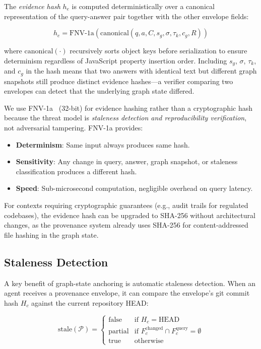 \documentclass[conference]{IEEEtran}
\begin{document}
The \emph{evidence hash} $h_e$ is computed deterministically over a
canonical representation of the query-answer pair together with the
other envelope fields:

\begin{equation}
  h_e = \text{FNV-1a}\!\left(\text{canonical}(q, a, C, s_g, \sigma, \tau_k, c_g, R)\right)
  \label{eq:evidence-hash}
\end{equation}

where $\text{canonical}(\cdot)$ recursively sorts object keys before
serialization to ensure determinism regardless of JavaScript property
insertion order. Including $s_g$, $\sigma$, $\tau_k$, and $c_g$ in the
hash means that two answers with identical text but different graph
snapshots still produce distinct evidence hashes---a verifier comparing
two envelopes can detect that the underlying graph state differed.

We use FNV-1a~\cite{Fowler2005} (32-bit) for evidence hashing rather
than a cryptographic hash because the threat model is \emph{staleness
detection and reproducibility verification}, not adversarial tampering.
FNV-1a provides:

\begin{itemize}
  \item \textbf{Determinism}: Same input always produces same hash.
  \item \textbf{Sensitivity}: Any change in query, answer, graph
    snapshot, or staleness classification produces a different hash.
  \item \textbf{Speed}: Sub-microsecond computation, negligible
    overhead on query latency.
\end{itemize}

For contexts requiring cryptographic guarantees (e.g., audit trails for
regulated codebases), the evidence hash can be upgraded to SHA-256
without architectural changes, as the provenance system already uses
SHA-256 for content-addressed file hashing in the graph state.

\subsection{Staleness Detection}
\label{sec:approach:staleness}

A key benefit of graph-state anchoring is automatic staleness detection.
When an agent receives a provenance envelope, it can compare the
envelope's git commit hash $H_c$ against the current repository HEAD:

\begin{equation}
  \text{stale}(\mathcal{P}) =
  \begin{cases}
    \text{false} & \text{if } H_c = \text{HEAD} \\
    \text{partial} & \text{if } F_c^{\text{changed}} \cap F_c^{\text{query}} = \emptyset \\
    \text{true} & \text{otherwise}
  \end{cases}
  \label{eq:staleness}
\end{equation}
\end{document}
